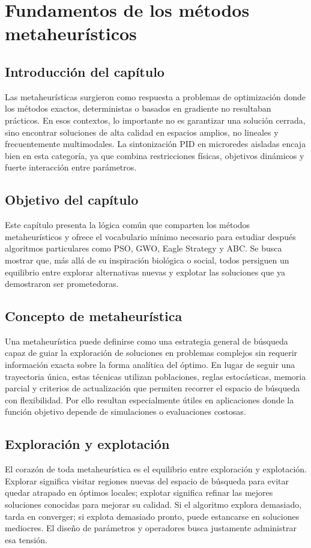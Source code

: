 \chapter{Fundamentos de los métodos metaheurísticos}
\label{ch:fundamentos-metaheuristicos}

\section{Introducción del capítulo}
Las metaheurísticas surgieron como respuesta a problemas de optimización donde los métodos
exactos, deterministas o basados en gradiente no resultaban prácticos. En esos contextos, lo
importante no es garantizar una solución cerrada, sino encontrar soluciones de alta calidad en
espacios amplios, no lineales y frecuentemente multimodales. La sintonización PID en
microredes aisladas encaja bien en esta categoría, ya que combina restricciones físicas,
objetivos dinámicos y fuerte interacción entre parámetros.

\section{Objetivo del capítulo}
Este capítulo presenta la lógica común que comparten los métodos metaheurísticos y ofrece el
vocabulario mínimo necesario para estudiar después algoritmos particulares como PSO, GWO,
Eagle Strategy y ABC. Se busca mostrar que, más allá de su inspiración biológica o social,
todos persiguen un equilibrio entre explorar alternativas nuevas y explotar las soluciones que
ya demostraron ser prometedoras.

\section{Concepto de metaheurística}
Una metaheurística puede definirse como una estrategia general de búsqueda capaz de guiar
la exploración de soluciones en problemas complejos sin requerir información exacta sobre la
forma analítica del óptimo. En lugar de seguir una trayectoria única, estas técnicas utilizan
poblaciones, reglas estocásticas, memoria parcial y criterios de actualización que permiten
recorrer el espacio de búsqueda con flexibilidad. Por ello resultan especialmente útiles en
aplicaciones donde la función objetivo depende de simulaciones o evaluaciones costosas.

\section{Exploración y explotación}
El corazón de toda metaheurística es el equilibrio entre exploración y explotación. Explorar
significa visitar regiones nuevas del espacio de búsqueda para evitar quedar atrapado en
óptimos locales; explotar significa refinar las mejores soluciones conocidas para mejorar su
calidad. Si el algoritmo explora demasiado, tarda en converger; si explota demasiado pronto,
puede estancarse en soluciones mediocres. El diseño de parámetros y operadores busca
justamente administrar esa tensión.

